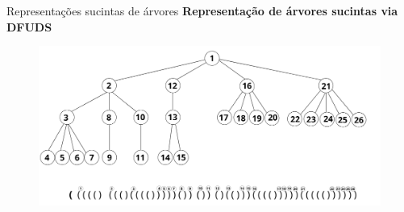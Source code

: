 \begin{frame}{Representações sucintas de árvores}
    \textbf{Representação de árvores sucintas via DFUDS}
        \begin{figure}[h!]
            \centering
            \includegraphics[scale=0.37]{images/dfuds.png}
        \end{figure} 
\end{frame}